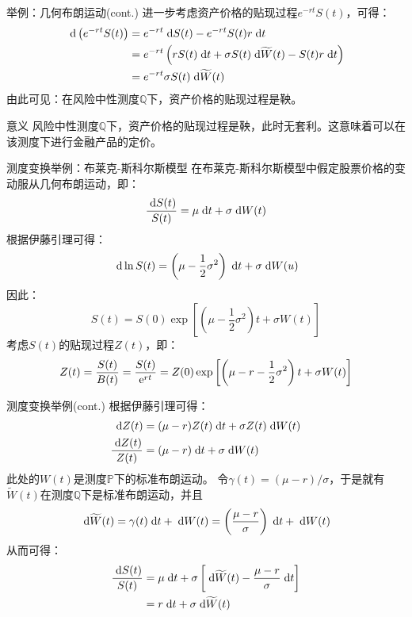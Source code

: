 \documentclass[t]{beamer}
\newcommand{\dif}{{\;\rm d}}
\begin{document}
\begin{frame}{举例：几何布朗运动(cont.)}
进一步考虑资产价格的贴现过程$e^{-rt}S(t)$，可得：
\begin{equation*}
\begin{split}
\dif\left( e^{-rt}S(t)\right) &=e^{-rt}\dif S(t)-e^{-rt}S(t)r\dif t\\
&=e^{-rt}\left(rS(t)\dif t+\sigma S(t)\dif \widetilde{W}(t) -S(t)r\dif t\right) \\
&=e^{-rt} \sigma S(t)\dif \widetilde{W}(t)
\end{split}
\end{equation*}
由此可见：{\color{red}在风险中性测度$\mathbb{Q}$下，资产价格的贴现过程是鞅}。

\begin{block}{意义}
风险中性测度$\mathbb{Q}$下，资产价格的贴现过程是鞅，此时{\color{red}无套利}。这意味着可以在该测度下进行金融产品的定价。
\end{block}
\end{frame}




\begin{frame}{测度变换举例：布莱克-斯科尔斯模型}
	在布莱克-斯科尔斯模型中假定股票价格的变动服从几何布朗运动，即：
\begin{equation*}
\frac{\dif S(t)}{S(t)}=\mu \dif t+\sigma \dif W(t)
\end{equation*}
根据伊藤引理可得：
\[\dif \ln S(t)=\left( \mu-\frac{1}{2}\sigma^2\right) \dif t+ \sigma \dif W(u) \]
因此：
\[S(t)=S(0)\exp\left[\left(\mu-\frac{1}{2}\sigma^2 \right)t+\sigma W(t)  \right] \]
考虑$S(t)$的贴现过程$Z(t)$，即：
\[Z(t)=\frac{S(t)}{B(t)}=\frac{S(t)}{{\rm e}^{rt}}=Z(0)\exp\left[\left(\mu-r-\frac{1}{2}\sigma^2 \right)t+\sigma W(t)  \right]  \]
\end{frame}

\begin{frame}{测度变换举例(cont.)}\small
	根据伊藤引理可得：
	\[\begin{split}
	\dif Z(t)&=(\mu-r)Z(t)\dif t+\sigma Z(t)\dif W(t)\\
	\frac{\dif Z(t)}{Z(t)}&=(\mu-r)\dif t+\sigma \dif W(t)
	\end{split} \]
	此处的$W(t)$是测度$\mathbb{P}$下的标准布朗运动。
	令$\gamma(t)=(\mu-r)/\sigma$，于是就有$\widetilde{W}(t)$在测度$\mathbb{Q}$下是标准布朗运动，并且
	\begin{equation*}
	\dif \widetilde{W}(t)=\gamma(t)\dif t+\dif W(t)=\left( \frac{\mu-r}{\sigma}\right) \dif t+\dif W(t)
	\end{equation*}	
	从而可得：
\begin{equation*}
\begin{split}
\frac{\dif S(t)}{S(t)}&=\mu \dif t+\sigma \left[\dif \widetilde{W}(t)-\frac{\mu-r}{\sigma}\dif t \right] \\
&=r\dif t+\sigma\dif \widetilde{W}(t)
\end{split}
\end{equation*}
\end{frame}
\end{document}
